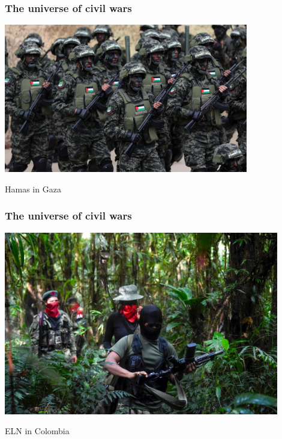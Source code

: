 \documentclass[aspectratio=43]{beamer}
\begin{document}
\begin{frame}
\frametitle{The universe of civil wars}
\centering

\includegraphics[width = 0.8\textwidth]{img/hamas}

Hamas in Gaza

\end{frame}

\begin{frame}
\frametitle{The universe of civil wars}
\centering

\includegraphics[width = 0.9\textwidth]{img/colombia}

\vspace{15pt}

ELN in Colombia

\end{frame}

\end{document}
